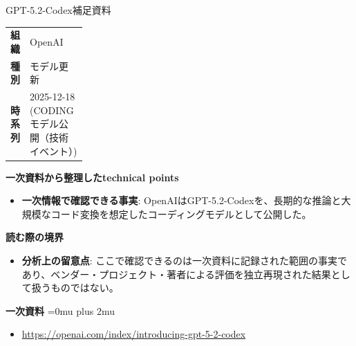 \begin{technicalnote}{GPT-5.2-Codex}{補足資料}
\begingroup
\begin{tabularx}{\linewidth}{@{}>{\bfseries}p{0.22\linewidth}X@{}}
組織 & OpenAI \\
種別 & モデル更新 \\
時系列 & 2025-12-18 (CODING モデル公開（技術イベント）) \\
\end{tabularx}
\smallskip
{\bfseries 一次資料から整理したtechnical points}
\begin{itemize}[leftmargin=1.5em,itemsep=0.35em]
\item \textbf{一次情報で確認できる事実}: OpenAIはGPT-5.2-Codexを、長期的な推論と大規模なコード変換を想定したコーディングモデルとして公開した。
\end{itemize}
\begin{minipage}{\linewidth}
{\bfseries 読む際の境界}
\begin{itemize}[leftmargin=1.5em,itemsep=0.35em]
\item \textbf{分析上の留意点}: ここで確認できるのは一次資料に記録された範囲の事実であり、ベンダー・プロジェクト・著者による評価を独立再現された結果として扱うものではない。
\end{itemize}
\begin{samepage}
{\bfseries 一次資料}
\begingroup\sloppy
\Urlmuskip=0mu plus 2mu\relax
\begin{itemize}[leftmargin=1.5em,itemsep=0.25em]
\item {\scriptsize\url{https://openai.com/index/introducing-gpt-5-2-codex}}
\end{itemize}
\endgroup
\end{samepage}
\end{minipage}
\endgroup
\end{technicalnote}
\medskip
